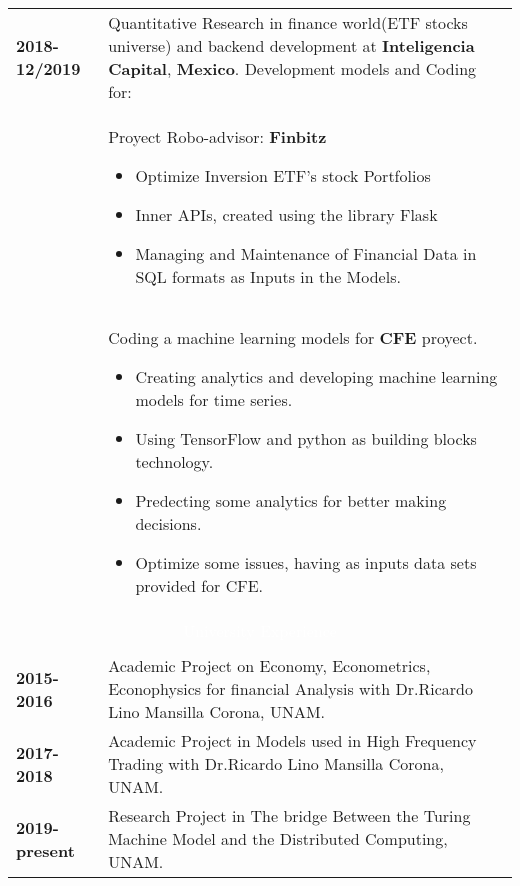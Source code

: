 \documentclass[twoside,a4paper,openright,10pt]{report}
\begin{document}
\begin{table}[ht]
\begin{tabular}{p{40mm} p{140mm}}
\textbf{2018-12/2019} & Quantitative Research in finance world(ETF stocks universe) and backend development at  \textbf{Inteligencia Capital}, \textbf{Mexico}. Development models and Coding for:\\
& \vspace{-2mm} Proyect Robo-advisor: \textbf{Finbitz} \begin{itemize}[noitemsep,nolistsep]
\item  Optimize Inversion ETF's stock Portfolios
\item Inner APIs, created using the library Flask
\item Managing and Maintenance of Financial Data in SQL formats as Inputs in the Models.
\vspace{-4mm}
\end{itemize}\\
& \vspace{-2mm}
Coding a machine learning models for \textbf{CFE} proyect.
\begin{itemize}
 \item Creating analytics and developing machine learning models for time series.
 \item Using TensorFlow and python as building blocks technology.
 \item Predecting some analytics for better making decisions.
 \item Optimize some issues, having as inputs data sets provided for CFE.
\end{itemize}

\\
\multicolumn{2}{c}{\cellcolor{black} \textcolor{white}{University Experience}}\\ \\

\textbf{2015- 2016} & Academic Project on Economy, Econometrics, Econophysics for financial Analysis with Dr.Ricardo Lino Mansilla Corona, UNAM.\\
\textbf{2017- 2018} & Academic Project in Models used in High Frequency Trading with Dr.Ricardo Lino Mansilla Corona, UNAM.\\
\textbf{2019-present} & Research Project in The bridge Between the Turing Machine Model and the Distributed Computing, UNAM.\\



\end{tabular}
\end{table}
\end{document}
